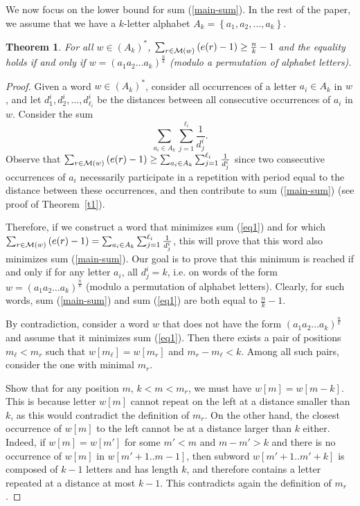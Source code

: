\documentclass[11pt]{article}
\newtheorem{theorem}{Theorem}
\def\paren#1{\left( #1 \right)}
\def\acc#1{\left\{ #1 \right\}}
\newcommand{\mr}[1]{{\cal M}({#1})}
\begin{document}
We now focus on the lower bound for sum (\ref{main-sum}). 
In the rest of the paper, we assume that we have a $k$-letter alphabet
$A_k=\acc{a_1,a_2,\dots,a_k}$. 

\begin{theorem}
\label{t3}
For all $w\in(A_k)^*$, $\sum_{r\in \mr{w}}\paren{e(r)-1}\ge\frac{n}{k}-1$ and
the equality holds
if and only if $w=\paren{a_1 a_2 \ldots a_k}^{\frac{n}{k}}$ (modulo a
permutation of alphabet letters). 
\end{theorem}
\begin{proof}
Given a word $w\in (A_k)^*$, consider all occurrences of a letter
$a_i\in A_k$ in $w$, and let $d^i_1,d^i_2,\ldots,d^i_{\ell_i}$
be the distances between all consecutive occurrences of $a_i$ in
$w$. Consider the sum 
\begin{equation}
\sum_{a_i\in A_k} \sum_{j=1}^{\ell_i}\frac{1}{d^i_{j}}. 
\label{eq1}
\end{equation}
Observe that $\sum_{r\in \mr{w}}\paren{e(r)-1}\ge \sum_{a_i\in
  A_k}\sum_{j=1}^{\ell_i}\frac{1}{d^i_{j}}$ since two consecutive
occurrences of $a_i$ necessarily participate in a repetition with 
period equal to the distance between these occurrences, and then
contribute to sum (\ref{main-sum}) (see proof of Theorem~\ref{t1}). 

Therefore, if we
construct a word that minimizes sum (\ref{eq1}) and for which
$\sum_{r\in \mr{w}}\paren{e(r)-1}= \sum_{a_i\in
  A_k}\sum_{j=1}^{\ell_i}\frac{1}{d^i_{j}}$, this will prove that this
word also minimizes 
sum (\ref{main-sum}). 
Our goal is to prove that this minimum is reached if and only if for
any letter $a_i$, all $d^i_j=k$, i.e. on words of the form
$w=\paren{a_1 a_2 \ldots a_k}^{\frac{n}{k}}$ (modulo a 
permutation of alphabet letters). Clearly, for such words, sum
(\ref{main-sum}) and sum (\ref{eq1}) are both equal to
$\frac{n}{k}-1$. 

By contradiction, consider a word $w$ that does not have the form
$\paren{a_1 a_2 \ldots a_k}^{\frac{n}{k}}$ and assume that it
minimizes sum (\ref{eq1}). 
Then there exists a pair of positions $m_\ell<m_r$ such that
$w[m_\ell]=w[m_r]$ and $m_r-m_\ell<k$. Among all such pairs,
consider the one with minimal $m_r$. 


Show that for any position $m$, $k<m<m_r$, we must have
$w[m]=w[m-k]$. This is because letter $w[m]$ cannot repeat on the left
at a distance smaller than $k$, as this would contradict the
definition of $m_r$. On the other hand, the closest occurrence of
$w[m]$ to the left cannot be at a distance larger than $k$
either. Indeed, if $w[m]=w[m']$ for some $m'<m$ and $m-m'>k$ and there
is no occurrence of $w[m]$ in $w[m'+1..m-1]$, then  subword
$w[m'+1..m'+k]$ is composed of $k-1$ letters and has length $k$, and
therefore contains a letter repeated at a distance at most $k-1$. This
contradicts again the definition of $m_r$. 


\end{proof}
\end{document}
